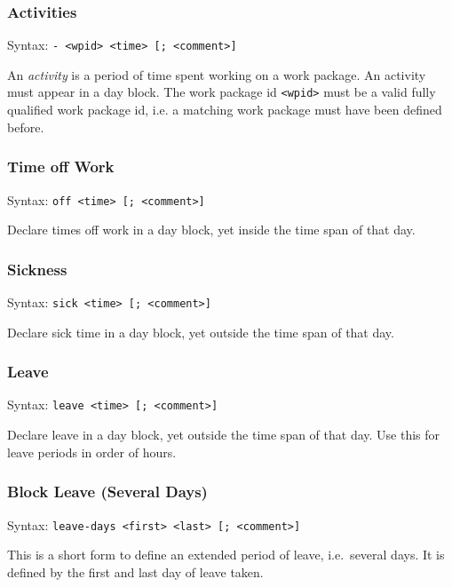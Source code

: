 \documentclass[11pt]{article}
\begin{document}

\subsubsection{Activities}

Syntax: \verb:- <wpid> <time> [; <comment>]:

An \emph{activity} is a period of time spent working on a work package. An activity must appear in a day block. The work package id \verb:<wpid>: must be a valid fully qualified work package id, i.e. a matching work package must have been defined before.

\subsubsection{Time off Work}

Syntax: \verb:off <time> [; <comment>]:

Declare times off work in a day block, yet inside the time span of that day.
 
\subsubsection{Sickness}

Syntax: \verb:sick <time> [; <comment>]:

Declare sick time in a day block, yet outside the time span of that day.

\subsubsection{Leave}

Syntax: \verb:leave <time> [; <comment>]:

Declare leave in a day block, yet outside the time span of that day. Use this for leave periods in order of hours.

\subsubsection{Block Leave (Several Days)}

Syntax: \verb:leave-days <first> <last> [; <comment>]:

This is a short form to define an extended period of leave, i.e.\ several days. It is defined by the first and last day of leave taken.
\end{document}
